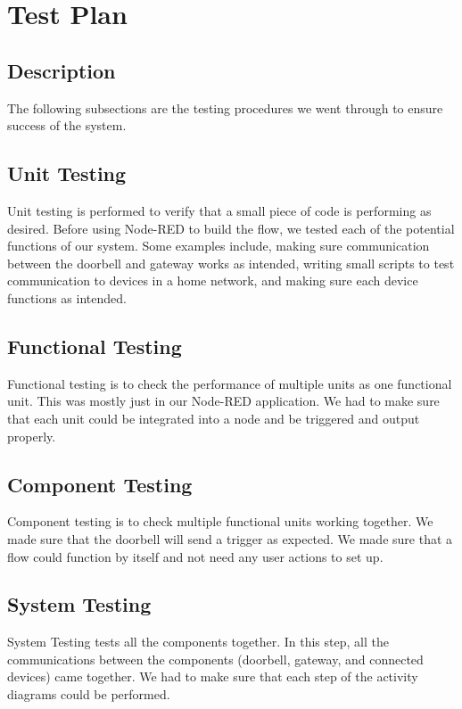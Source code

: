 \chapter{Test Plan}

\section{Description}
The following subsections are the testing procedures we went through to ensure success of the system.

\section{Unit Testing}
Unit testing is performed to verify that a small piece of code is performing as desired. Before using Node-RED to build the flow, we tested each of the potential functions of our system. Some examples include, making sure communication between the doorbell and gateway works as intended, writing small scripts to test communication to devices in a home network, and making sure each device functions as intended.

\section{Functional Testing}
Functional testing is to check the performance of multiple units as one functional unit. This was mostly just in our Node-RED application. We had to make sure that each unit could be integrated into a node and be triggered and output properly.

\section{Component Testing}
Component testing is to check multiple functional units working together. We made sure that the doorbell will send a trigger as expected. We made sure that a flow could function by itself and not need any user actions to set up.

\section{System Testing}
System Testing tests all the components together. In this step, all the communications between the components (doorbell, gateway, and connected devices) came together. We had to make sure that each step of the activity diagrams could be performed.